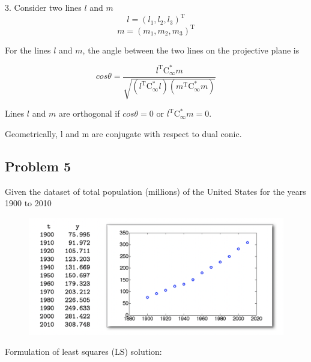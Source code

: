 \documentclass[conference]{IEEEtran}
\begin{document}
3. Consider two lines \( l \) and \( m \) 
\[ l = (l_1, l_2, l_3)^\mathrm{T}\]
\[ m = (m_1, m_2, m_3)^\mathrm{T}\] 

For the lines \( l \) and \( m \), the angle between the two lines on the projective plane is

\[ cos\theta = \frac{l^\mathrm{T}\mathrm{C}^{*}_{\infty}m}
{\sqrt{(l^\mathrm{T}\mathrm{C}^{*}_{\infty}l)(m^\mathrm{T}\mathrm{C}^{*}_{\infty}m)}} \]

Lines \( l \) and \( m \) are orthogonal if \( cos\theta = 0 \) or \(l^\mathrm{T}\mathrm{C}^{*}_{\infty}m = 0\). 

Geometrically, l and m are conjugate with respect to dual conic.  

\clearpage

\subsection{Problem 5}

Given the dataset of total population (millions) of the United States for the years 1900 to 2010

\begin{figure}[h!]
\centering
\includegraphics[width=1\linewidth]{images/population.jpg}
\label{fig:population}
\end{figure}

Formulation of least squares (LS) solution:
\end{document}
